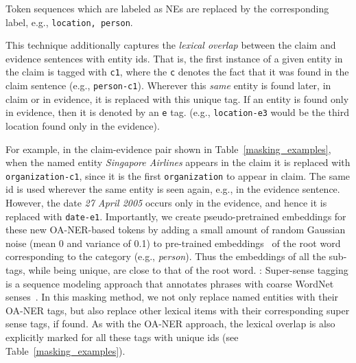 \documentclass[11pt,a4paper]{article}
\begin{document}
{}  Token sequences which are labeled as NEs are replaced by the corresponding label, e.g., \texttt{location, person}.

{} This technique additionally captures the \textit{lexical overlap} between the claim and evidence sentences with entity ids.  
That is, the first instance of a given entity in the claim is tagged with \texttt{c1}, where the \texttt{c} denotes the fact that it was found in the claim sentence (e.g., \texttt{person-c1}). Wherever this {\em same} entity is found later, in claim or in evidence, it is replaced with this unique tag. If an entity is found only in evidence, then it is denoted by an \texttt{e} tag. (e.g., \texttt{location-e3} would be the third location found only in the evidence).

For example, in the claim-evidence pair shown in Table~\ref{masking_examples}, when the named entity \textit{Singapore Airlines} appears in the claim it is replaced with \texttt{organization-c1}, since it is the first \texttt{organization} to appear in claim. 
The same id is used wherever the same entity is seen again, e.g., in the evidence sentence. However, the date \textit{27 April 2005} occurs only in the evidence, and hence it is replaced with \texttt{date-e1}.
Importantly, we create pseudo-pretrained embeddings for these new OA-NER-based tokens by adding a small amount of random Gaussian noise (mean 0 and variance of 0.1) to pre-trained embeddings~\citep{pennington2014glove} of the root word corresponding to the category (e.g., \textit{person}). Thus the embeddings of all the sub-tags, while being unique, are close to that of the root word.
{}:
Super-sense tagging is a sequence modeling approach that annotates phrases with coarse WordNet senses~\citep{ciaramita2003supersense,miller1990introduction}. In this masking method, we not only replace named entities with their OA-NER tags, but also replace other lexical items with their corresponding super sense tags, if found. As with the OA-NER approach, the lexical overlap is also explicitly marked for all these tags with unique ids (see Table~\ref{masking_examples}). 
\end{document}
